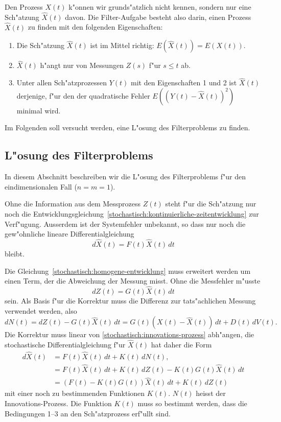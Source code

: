 Den Prozess $X(t)$ k"onnen wir grunds"atzlich nicht kennen, sondern
nur eine Sch"atzung $\hat X(t)$ davon.
Die Filter-Aufgabe besteht also darin, einen Prozess $\hat X(t)$ zu
finden mit den folgenden Eigenschaften:
\begin{enumerate}
\item
Die Sch"atzung $\hat X(t)$ ist im Mittel richtig:
$E(\hat X(t)) = E(X(t))$.
\item
$\hat X(t)$ h"angt nur von Messungen $Z(s)$ f"ur $s\le t$ ab.
\item
Unter allen Sch"atzprozessen $Y(t)$ mit den Eigenschaften 1 und 2 ist
$\hat X(t)$ derjenige, f"ur den der quadratische Fehler 
$E((Y(t)-\hat X(t))^2)$  minimal wird.
\end{enumerate}
Im Folgenden soll versucht werden, eine L"osung des Filterproblems zu
finden.

%
%
\subsection{L"osung des Filterproblems\label{stochastisch:loesung-filterproblem}}
In diesem Abschnitt beschreiben wir die L"osung des Filterproblems
f"ur den eindimensionalen Fall ($n=m=1$).

Ohne die Information aus dem Messprozess $Z(t)$ steht f"ur die 
Sch"atzung nur noch die
Entwicklungsgleichung~\eqref{stochastisch:kontinuierliche-zeitentwicklung}
zur Verf"ugung.
Ausserdem ist der Systemfehler unbekannt, so dass nur noch die gew"ohnliche
lineare Differentialgleichung
\begin{equation}
d\hat X(t) = F(t)\hat X(t)\,dt
\label{stochastisch:homogene-entwicklung}
\end{equation}
bleibt.

Die Gleichung~\eqref{stochastisch:homogene-entwicklung} muss erweitert
werden um einen Term, der die Abweichung der Messung misst.
Ohne die Messfehler m"usste
\[
dZ(t) = G(t)\hat X(t)\,dt
\]
sein.
Als Basis f"ur die Korrektur muss die Differenz zur tats"achlichen
Messung verwendet werden, also
\begin{equation}
dN(t)
=
dZ(t) - G(t)\hat X(t)\,dt
=
G(t)(X(t)-\hat X(t))\,dt + D(t)\,dV(t)
.
\label{stochastisch:innovations-prozess}
\end{equation}
Die Korrektur muss linear von \eqref{stochastisch:innovations-prozess}
abh"angen, die stochastische Differentialgleichung f"ur $\hat X(t)$
hat daher die Form
\begin{align*}
d\hat X(t)
&=
F(t)\hat X(t)\,dt + K(t)\,dN(t),
\\
&=
F(t)\hat X(t)\,dt
+
K(t)\,dZ(t) - K(t)G(t)\hat X(t)\,dt
\\
&=
(F(t)-K(t)G(t))\hat X(t)\,dt
+
K(t)\,dZ(t)
\end{align*}
mit einer noch zu bestimmenden Funktionen $K(t)$.
$N(t)$ heisst der Innovations-Prozess.
Die Funktion $K(t)$ muss so bestimmt werden, dass die Bedingungen
1--3 an den Sch"atzprozess erf"ullt sind.

